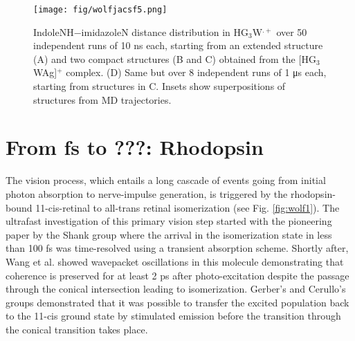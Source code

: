 \documentclass[journal=jacsat,manuscript=article]{achemso}
\begin{document}
\begin{figure}[t]
\centering
\texttt{[image: fig/wolfjacsf5.png]}
\caption{IndoleNH−imidazoleN distance distribution in HG$_3$W$^{.+}$
  over 50 independent runs of 10 ns each, starting from an extended
  structure (A) and two compact structures (B and C) obtained from the
  [HG$_3$WAg]$^+$ complex. (D) Same but over 8 independent runs of 1
  μs each, starting from structures in C. Insets show superpositions
  of structures from MD trajectories.}
\label{fig:fig5jacs}
\end{figure}


\section{From fs to ???: Rhodopsin}
The vision process, which entails a long cascade of events going from
initial photon absorption to nerve-impulse generation, is triggered by
the rhodopsin-bound 11-cis-retinal to all-trans retinal isomerization
(see Fig. \ref{fig:wolf1}). The ultrafast investigation of this
primary vision step started with the pioneering paper by the Shank
group where the arrival in the isomerization state in less than 100 fs
was time-resolved using a transient absorption
scheme.\cite{schonlein:1991} Shortly after, Wang et al. showed
wavepacket oscillations in this molecule demonstrating that coherence
is preserved for at least 2 ps after photo-excitation despite the
passage through the conical intersection leading to
isomerization.\cite{wang:1994} Gerber’s and Cerullo’s groups
demonstrated that it was possible to transfer the excited population
back to the 11-cis ground state by stimulated emission before the
transition through the conical transition takes
place.\cite{polli:2010,gerber:2006}\\
\end{document}
